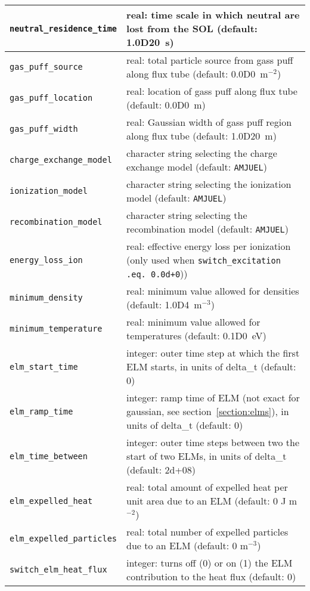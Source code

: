 \documentclass[amsmath,amssymb,a4]{revtex4-2}
\begin{document}
\begin{table}[h]
\begin{center}
\begin{tabular}{|| l  | l ||}
    {\tt neutral\_residence\_time}& real: time scale in which neutral are lost from the SOL (default: 1.0D20~s) \\ \hline
    {\tt gas\_puff\_source}      & real: total particle source from gass puff along flux tube (default: 0.0D0~m$^{-2}$) \\ \hline
    {\tt gas\_puff\_location}    & real: location of gass puff along flux tube (default: 0.0D0~m) \\ \hline
    {\tt gas\_puff\_width}       & real: Gaussian width of gass puff region along flux tube (default: 1.0D20~m) \\ \hline
    {\tt charge\_exchange\_model}& character string selecting the charge exchange model (default: {\tt AMJUEL}) \\ \hline
    {\tt ionization\_model}      & character string selecting the ionization model (default: {\tt AMJUEL}) \\ \hline
    {\tt recombination\_model}   & character string selecting the recombination model (default: {\tt AMJUEL}) \\ \hline
    {\tt energy\_loss\_ion}      & real: effective energy loss per ionization (only used when {\tt switch\_excitation .eq. 0.0d+0})) \\ \hline
    {\tt minimum\_density}       & real: minimum value allowed for densities (default: 1.0D4~m$^{-3}$) \\ \hline
    {\tt minimum\_temperature}   & real: minimum value allowed for temperatures (default: 0.1D0~eV) \\ \hline
    {\tt elm\_start\_time}   	 & integer: outer time step at which the first ELM starts, in units of delta\_t (default: 0) \\ \hline
    {\tt elm\_ramp\_time}   	 & integer: ramp time of ELM (not exact for gaussian, see section~\ref{section:elms}), in units of delta\_t (default: 0) \\ \hline
    {\tt elm\_time\_between}    & integer: outer time steps between two the start of two ELMs, in units of delta\_t (default: 2d+08) \\ \hline
    {\tt elm\_expelled\_heat}    & real: total amount of expelled heat per unit area due to an ELM (default: 0 J m$^{-2}$) \\ \hline
    {\tt elm\_expelled\_particles}& real: total number of expelled particles due to an ELM (default: 0 m$^{-3}$) \\ \hline
    {\tt switch\_elm\_heat\_flux}& integer: turns off (0) or on (1) the ELM contribution to the heat flux (default: 0) \\ \hline

\end{tabular}
\end{center}
\end{table}
\end{document}
